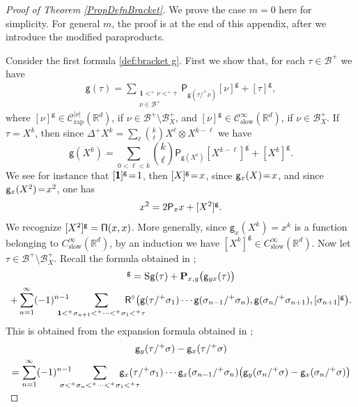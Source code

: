 \documentclass[JEP,XML,SOM,Unicode,published]{cedram}
\theoremstyle{plain}
\theoremstyle{definition}
\newcommand{\unit}{\mathbf{1}}
\newcommand{\rap}{\mathrm{rap}}
\newcommand{\slow}{\mathrm{slow}}
\newcommand{\bfP}{\mathbf{P}}
\newcommand{\sfP}{\mathsf{P}}
\newcommand{\sfR}{\mathsf{R}}
\newcommand{\sfg}{\mathsf{g}}
\newcommand{\bbR}{\mathbb{R}}
\newcommand{\mcB}{\mathcal{B}}
\newcommand{\mcC}{\mathcal{C}}
\begin{document}
\begin{proof}[Proof of Theorem \ref{PropDefnBracket}]
We prove the case $m=0$ here for simplicity. For general $m$, the proof is at the end of this appendix, after we introduce the modified paraproducts.

Consider the first formula \eqref{def:bracket g}. First we show that, for each $\tau\in\mcB^+$ we have
\begin{align}\label{predef:bracket g}
\sfg(\tau)=\sum_{\substack{\unit<^+\nu<^+\tau\\ \nu\in\mcB^+}}\sfP_{\sfg(\tau/^+\nu)}[\nu]^\sfg+[\tau]^\sfg,
\end{align}
where $[\nu]^\sfg\in \mcC_\rap^{|\nu|}(\bbR^d)$, if $\nu\in\mcB^+\setminus\mcB_X^+$, and $[\nu]^\sfg\in \mcC_\slow^\infty(\bbR^d)$, if $\nu\in\mcB_X^+$. If $\tau=X^k$, then since $\Delta^+X^k=\sum_{\ell}\binom{k}{\ell}X^\ell\otimes X^{k-\ell}$ we have
\[
\sfg(X^k)=\sum_{0<\ell<k}\binom{k}{\ell}\sfP_{\sfg(X^\ell)}[X^{k-\ell}]^\sfg+[X^k]^\sfg.
\]
We see for instance that $[\boldsymbol{\mathsf{1}}]^{\sf g}\!=\!1$, then $[X]^{\sf g}\!=\!x$, since ${\sf g}_x(X)\!=\!x$, and since ${\sf g}_x(X^2)\!=\!x^2$, one has
\[
x^2 = 2{\sf P}_xx + [X^2]^{\sf g}.
\]
We recognize $[X^2]^{\sf g}={\sf \Pi}(x,x)$. More generally, since $\sfg_x(X^k)=x^k$ is a function belonging to $C_\slow^\infty(\bbR^d)$, by an induction we have $[X^k]^\sfg\in C_\slow^\infty(\bbR^d)$. Now let $\tau\in\mcB^+\setminus\mcB_X^+$. Recall the formula obtained in \cite{BH};
\begin{multline*}
[\tau]^\sfg = \textsc{S}\sfg(\tau)+\bfP_{x,y}\bigl(\sfg_{yx}(\tau)\bigr) \\
+ \sum_{n=1}^\infty(-1)^{n-1}\hspace*{-5mm}\sum_{\unit<^+\sigma_{n+1}<^+\cdots<^+\sigma_1<^+\tau}\hspace*{-8mm} {\sfR}^\circ\bigl(\sfg(\tau/^+\sigma_1)\cdots\sfg(\sigma_{n-1}/^+\sigma_n),\sfg(\sigma_n/^+\sigma_{n+1}),[\sigma_{n+1}]^\sfg\bigr).
\end{multline*}
This is obtained from the expansion formula obtained in \cite{BH};
\begin{multline}\label{expansion of g(tau/sigma)}
\sfg_y(\tau/^+\sigma)-\sfg_x(\tau/^+\sigma)\\
=\sum_{n=1}^\infty(-1)^{n-1}\hspace*{-5mm}\sum_{\sigma<^+\sigma_n<^+\cdots<^+\sigma_1<^+\tau}\hspace*{-8mm}
\sfg_x(\tau/^+\sigma_1)\cdots\sfg_x(\sigma_{n-1}/^+\sigma_n)\bigl(\sfg_y(\sigma_n/^+\sigma)-\sfg_x(\sigma_n/^+\sigma)\bigr)\\[-5pt]

\end{multline}
\end{proof}
\end{document}
